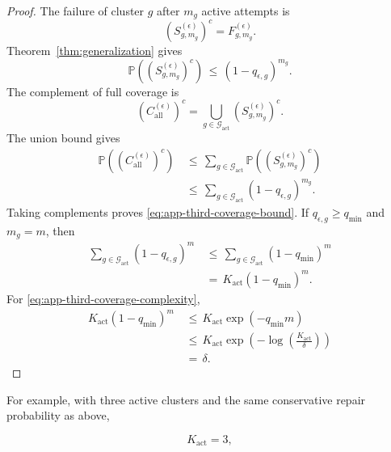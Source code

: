 \documentclass{article} %
\begin{document}
\begin{proof}
The failure of cluster \(g\) after \(m_g\) active attempts is
\begin{equation}
\label{eq:app-third-coverage-fail-g}
\left(S_{g,m_g}^{(\epsilon)}\right)^{c}
=
F_{g,m_g}^{(\epsilon)}.
\end{equation}
Theorem~\ref{thm:generalization} gives
\begin{equation}
\label{eq:app-third-coverage-fail-bound}
\mathbb{P}\!\left(
\left(S_{g,m_g}^{(\epsilon)}\right)^c
\right)
\,\le\,
(1-q_{\epsilon,g})^{m_g}.
\end{equation}
The complement of full coverage is
\begin{equation}
\label{eq:app-third-coverage-complement}
\left(C_{\mathrm{all}}^{(\epsilon)}\right)^c
=
\bigcup_{g\in\mathcal{G}_{\mathrm{act}}}
\left(S_{g,m_g}^{(\epsilon)}\right)^c.
\end{equation}
The union bound gives
\begin{align}
\label{eq:app-third-coverage-union}
\mathbb{P}\!\left(
\left(C_{\mathrm{all}}^{(\epsilon)}\right)^c
\right)
&\,\le\,
\sum_{g\in\mathcal{G}_{\mathrm{act}}}
\mathbb{P}\!\left(
\left(S_{g,m_g}^{(\epsilon)}\right)^c
\right)
\\
&\,\le\,
\sum_{g\in\mathcal{G}_{\mathrm{act}}}
(1-q_{\epsilon,g})^{m_g}.
\end{align}
Taking complements proves \eqref{eq:app-third-coverage-bound}.  If \(q_{\epsilon,g}\ge q_{\min}\) and \(m_g=m\), then
\begin{align}
\label{eq:app-third-coverage-uniform-proof}
\sum_{g\in\mathcal{G}_{\mathrm{act}}}
(1-q_{\epsilon,g})^{m}
&\,\le\,
\sum_{g\in\mathcal{G}_{\mathrm{act}}}
(1-q_{\min})^{m}
\\
&\,=\,
K_{\mathrm{act}}(1-q_{\min})^{m}.
\end{align}
For \eqref{eq:app-third-coverage-complexity},
\begin{align}
\label{eq:app-third-coverage-complexity-proof}
K_{\mathrm{act}}(1-q_{\min})^{m}
&\,\le\,
K_{\mathrm{act}}\exp(-q_{\min}m)
\\
&\,\le\,
K_{\mathrm{act}}
\exp\!\left(
-\log\!\left(\frac{K_{\mathrm{act}}}{\delta}\right)
\right)
\\
&\,=\,
\delta.
\end{align}
\end{proof}

For example, with three active clusters and the same conservative repair probability as above,

\begin{equation}
\label{eq:app-third-coverage-example-k}
K_{\mathrm{act}}
=
3,
\end{equation}
\end{document}
